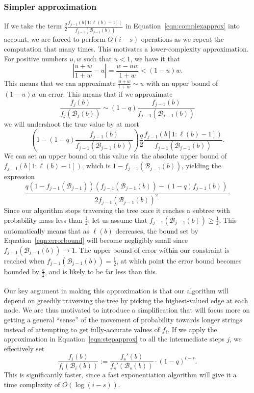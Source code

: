 \documentclass{IEEEtran}
\begin{document}
\subsubsection{Simpler approximation}
If we take the term $\frac{q}{2}\frac{f_{j-1}(b[1:\ell(b)-1])}
{f_{j-1}(\mathcal{B}_{j-1}(b))}$ in Equation~\ref{eqn:complexapprox} into
account, we are forced to perform $O(i-s)$ operations as we repeat
the computation that many times. This motivates a lower-complexity
approximation. For positive
numbers $u,w$ such that  $u < 1$, we have it that
\begin{equation}
	\left|\frac{u+w}{1+w}-u\right|=\frac{w-uw}{1+w}
	< (1-u)w.
\end{equation}
This means that we can approximate $\frac{u+w}{1+w} \sim u$ with an upper
bound of $(1-u)w$ on error. This means that if we approximate
\begin{equation}
	\frac{f_j(b)}{f_{j}(\mathcal{B}_j(b))} \sim (1-q) \frac{f_{j-1}(b)}{
		f_{j-1}(\mathcal{B}_{j-1}(b))}
	\label{eqn:stepapprox}
\end{equation}
we will undershoot the true value by at most
\begin{equation}
	\left(1-(1-q)\frac{f_{j-1}(b)}{
		f_{j-1}(\mathcal{B}_{j-1}(b))}\right)\frac{q}{2}
\frac{f_{j-1}(b[1:\ell(b)-1])}
{f_{j-1}(\mathcal{B}_{j-1}(b))}.
\end{equation}
We can set an upper bound on this value via the absolute upper bound of
$f_{j-1}(b[1:\ell(b)-1])$, which is $1-f_{j-1}(\mathcal{B}_{j-1}(b))$,
yielding the expression
\begin{equation}
	\frac{q(1-f_{j-1}(\mathcal{B}_{j-1}))
	(f_{j-1}(\mathcal{B}_{j-1}(b))-(1-q)f_{j-1}(b))}
	{2 f_{j-1}(\mathcal{B}_{j-1}(b))^2}.
\label{eqn:errorbound}
\end{equation}
Since our algorithm stops traversing the tree once it reaches a subtree
with probability mass less than $\frac{1}{2}$, let us assume that
$f_{j-1}(\mathcal{B}_{j-1}(b)) \geq \frac{1}{2}$. This automatically means
that as $\ell(b)$ decreases, the bound set by Equation~\ref{eqn:errorbound}
will become negligibly small since $f_{j-1}(\mathcal{B}_{j-1}(b)) \to 1$.
The upper bound of error within our constraint is reached when
$f_{j-1}(\mathcal{B}_{j-1}(b)) = \frac{1}{2}$, at which point the error
bound becomes bounded by $\frac{q}{2}$, and is likely to be far less than this.
\\ \\
Our key argument in making this approximation is that our algorithm will
depend on greedily traversing the tree by picking the highest-valued edge
at each node. We are thus motivated to introduce a simplification that will
focus more on getting a general ``sense'' of the movement of probability towards
longer strings instead of attempting to get fully-accurate values of $f_i$.
If we apply the approximation in Equation~\ref{eqn:stepapprox} to all the
intermediate steps $j$, we effectively set
\begin{equation}
\frac{f_i(b)}{f_i(\mathcal{B}_i(b))}:=\frac{f_s'(b)}{f_s'(\mathcal{B}_s(b))}
\cdot (1-q)^{i-s}.
\label{eqn:simpapprox}
\end{equation}
This is significantly faster, since a fast exponentiation algorithm will give
it a time complexity of $O(\log (i-s)) $.
\end{document}
